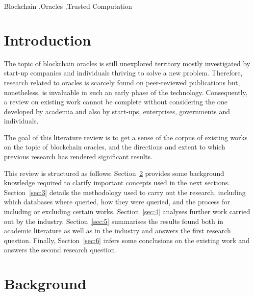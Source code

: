\documentclass[final,3p,12pt,twocolumn]{elsarticle}
\begin{document}
\begin{frontmatter}
\begin{abstract}
  \end{abstract}
  \begin{keyword}
    Blockchain \sep Oracles \sep Trusted Computation

  \end{keyword}



\end{frontmatter}



\section{Introduction}

The topic of blockchain oracles is still unexplored territory mostly investigated by start-up companies and individuals thriving to solve a new problem. Therefore, research related to oracles is scarcely found on peer-reviewed publications but, nonetheless, is invaluable in such an early phase of the technology. Consequently, a review on existing work cannot be complete without considering the one developed by academia and also by start-ups, enterprises, governments and individuals.

The goal of this literature review is to get a sense of the corpus of existing works on the topic of blockchain oracles, and the directions and extent to which previous research has rendered significant results.

This review is structured as follows: Section~\ref{sec:2} provides some background knowledge required to clarify important concepts used in the next sections. Section~\ref{sec:3} details the methodology used to carry out the research, including which databases where queried, how they were queried, and the process for including or excluding certain works. Section~\ref{sec:4} analyses further work carried out by the industry. Section~\ref{sec:5} summarises the results found both in academic literature as well as in the industry and answers the first research question. Finally, Section~\ref{sec:6} infers some conclusions on the existing work and answers the second research question.



\section{Background}\label{sec:2}
\end{document}
